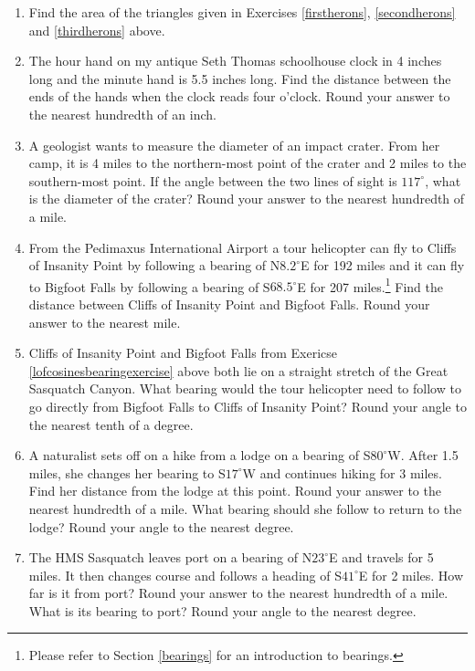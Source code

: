\begin{enumerate}

\setcounter{enumi}{\value{HW}}

\item Find the area of the triangles given in Exercises \ref{firstherons}, \ref{secondherons} and \ref{thirdherons} above.

\item The hour hand on my antique Seth Thomas schoolhouse clock in 4 inches long and the minute hand is 5.5 inches long.  Find the distance between the ends of the hands when the clock reads four o'clock.  Round your answer to the nearest hundredth of an inch.

\item A geologist wants to measure the diameter of an impact crater.   From her camp, it is 4 miles to the northern-most point of the crater and 2 miles to the southern-most point.  If the angle between the two lines of sight is $117^{\circ}$, what is the diameter of the crater?  Round your answer to the nearest hundredth of a mile.

\item From the Pedimaxus International Airport a tour helicopter can fly to Cliffs of Insanity Point by following a bearing of N$8.2^{\circ}$E for 192 miles and it can fly to Bigfoot Falls by following a bearing of S$68.5^{\circ}$E for 207 miles.\footnote{Please refer to Section \ref{bearings} for an introduction to bearings.}  Find the distance between Cliffs of Insanity Point and Bigfoot Falls.  Round your answer to the nearest mile.  \label{lofcosinesbearingexercise}

\item Cliffs of Insanity Point and Bigfoot Falls from Exericse \ref{lofcosinesbearingexercise} above both lie on a straight stretch of the Great Sasquatch Canyon.  What bearing would the tour helicopter need to follow to go directly from Bigfoot Falls to Cliffs of Insanity Point?  Round your angle to the nearest tenth of a degree.

\item  A naturalist sets off on a hike from a lodge on a bearing of S$80^{\circ}$W.  After 1.5 miles, she changes her bearing to S$17^{\circ}$W and continues hiking for 3 miles.  Find her distance from the lodge at this point.  Round your answer to the nearest hundredth of a mile.  What bearing should she follow to return to the lodge?  Round your angle to the nearest degree.

\item The HMS Sasquatch leaves port on a bearing of N$23^{\circ}$E and travels for 5 miles.  It then changes course and follows a heading of S$41^{\circ}$E for 2 miles.  How far is it from port? Round your answer to the nearest hundredth of a mile. What is its bearing to port?  Round your angle to the nearest degree.


\end{enumerate}

